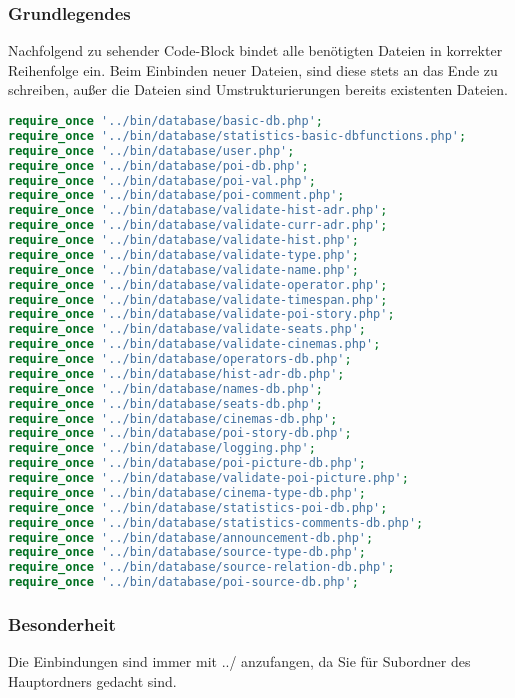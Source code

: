 \subsubsection{Grundlegendes}
Nachfolgend zu sehender Code-Block bindet alle benötigten Dateien in korrekter Reihenfolge ein. Beim Einbinden neuer Dateien, sind diese stets an das Ende zu schreiben, außer die Dateien sind Umstrukturierungen bereits existenten Dateien.
\begin{lstlisting}[language=php]
require_once '../bin/database/basic-db.php';
require_once '../bin/database/statistics-basic-dbfunctions.php';
require_once '../bin/database/user.php';
require_once '../bin/database/poi-db.php';
require_once '../bin/database/poi-val.php';
require_once '../bin/database/poi-comment.php';
require_once '../bin/database/validate-hist-adr.php';
require_once '../bin/database/validate-curr-adr.php';
require_once '../bin/database/validate-hist.php';
require_once '../bin/database/validate-type.php';
require_once '../bin/database/validate-name.php';
require_once '../bin/database/validate-operator.php';
require_once '../bin/database/validate-timespan.php';
require_once '../bin/database/validate-poi-story.php';
require_once '../bin/database/validate-seats.php';
require_once '../bin/database/validate-cinemas.php';
require_once '../bin/database/operators-db.php';
require_once '../bin/database/hist-adr-db.php';
require_once '../bin/database/names-db.php';
require_once '../bin/database/seats-db.php';
require_once '../bin/database/cinemas-db.php';
require_once '../bin/database/poi-story-db.php';
require_once '../bin/database/logging.php';
require_once '../bin/database/poi-picture-db.php';
require_once '../bin/database/validate-poi-picture.php';
require_once '../bin/database/cinema-type-db.php';
require_once '../bin/database/statistics-poi-db.php';
require_once '../bin/database/statistics-comments-db.php';
require_once '../bin/database/announcement-db.php';
require_once '../bin/database/source-type-db.php';
require_once '../bin/database/source-relation-db.php';
require_once '../bin/database/poi-source-db.php';
\end{lstlisting}
\subsubsection{Besonderheit}
Die Einbindungen sind immer mit {\glqq ../\grqq} anzufangen, da Sie für Subordner des Hauptordners gedacht sind.